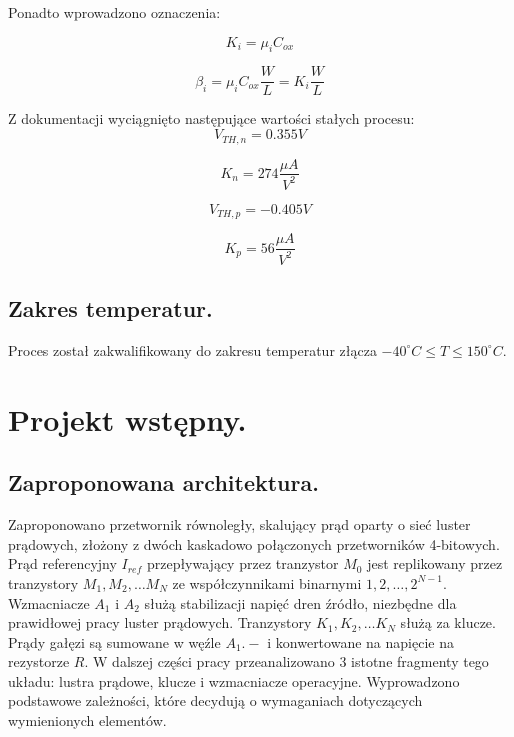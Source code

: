\documentclass[10pt,a4paper]{report}
\theoremstyle{definition}
\theoremstyle{definition}
\theoremstyle{definition}
\theoremstyle{definition}
\theoremstyle{definition}
\begin{document}
	{	Ponadto wprowadzono oznaczenia:
	
		$$
			K_i = \mu_i C_{ox}
		$$
	
		$$
			\beta_i = \mu_i C_{ox} \frac{W}{L} = K_i \frac{W}{L}
		$$
	}

	{	Z dokumentacji wyciągnięto następujące wartości stałych procesu:
		$$
			V_{TH,n} = 0.355V
		$$
		
		$$
			K_n = 274 \frac{\mu A}{V^2}
		$$

		$$
			V_{TH,p} = -0.405V
		$$
	
		$$
			K_p = 56 \frac{\mu A}{V^2}
		$$	
	}
	\section{Zakres temperatur.}
	{	Proces został zakwalifikowany do zakresu temperatur złącza $-40^\circ C \leq T \leq 150^\circ C$. }

	\chapter{Projekt wstępny.}


	\section{Zaproponowana architektura.}
	{	Zaproponowano przetwornik równoległy, skalujący prąd oparty o sieć luster prądowych, złożony z dwóch kaskadowo połączonych przetworników 4-bitowych. Prąd referencyjny $I_{ref}$ przepływający przez tranzystor $M_0$ jest replikowany przez tranzystory $M_1, M_2, \dots M_N$ ze współczynnikami binarnymi $1,2,\dots, 2^{N-1}$. Wzmacniacze $A_1$ i $A_2$ służą stabilizacji napięć dren źródło, niezbędne dla prawidłowej pracy luster prądowych. Tranzystory $K_1, K_2, \dots K_N$ służą za klucze. Prądy gałęzi są sumowane w węźle $A_1.-$ i konwertowane na napięcie na rezystorze $R$. W dalszej części pracy przeanalizowano 3 istotne fragmenty tego układu: lustra prądowe, klucze i wzmacniacze operacyjne. Wyprowadzono podstawowe zależności, które decydują o wymaganiach dotyczących wymienionych elementów.}
\end{document}
